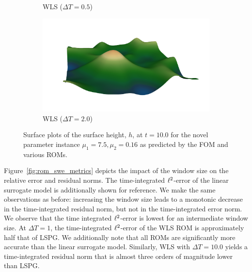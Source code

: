 \begin{figure}
\begin{center}
\begin{subfigure}[t]{0.49\textwidth}
\caption{WLS ($\Delta T = 0.5$)}
\end{subfigure}
\begin{subfigure}[t]{0.49\textwidth}
\includegraphics[trim={4cm 0cm 2cm 2cm},clip,width=1.0\linewidth]{figs/swe/h_wls_DT20_t50.png}
\caption{WLS ($\Delta T=2.0$)}
\end{subfigure}
\caption{Surface plots of the surface height, $h$, at $t=10.0$ for the novel parameter instance $\mu_1 = 7.5,\mu_2 = 0.16$ as predicted by the FOM and various ROMs.} 
\label{fig:rom_hsols_swe}
\end{center}
\end{figure}

Figure~\ref{fig:rom_swe_metrics} depicts the impact of the window size on the relative error and residual norms. The time-integrated $\ell^2$-error of the linear surrogate model is additionally shown for reference. We make the same observations as before: increasing the window size leads to a monotonic decrease in the time-integrated residual norm, but not in the time-integrated error norm. We observe that the time integrated $\ell^2$-error is lowest for an intermediate window size. At $\Delta T = 1$, the time-integrated $\ell^2$-error of the WLS ROM is approximately half that of LSPG. We additionally note that all ROMs are significantly more accurate than the linear surrogate model. Similarly, WLS with $\Delta T = 10.0$ yields a time-integrated residual norm that is almost three orders of magnitude lower than LSPG. 


